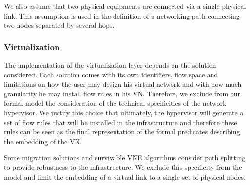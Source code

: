 We also assume that two physical equipments are connected via a single physical link. This assumption is used in the definition of a networking path connecting two nodes separated by several hops.

\subsubsection{Virtualization}
The implementation of the virtualization layer depends on the solution considered.
Each solution comes with its own identifiers, flow space and limitations on how the user may design his virtual network and with how much granularity he may install flow rules in his VN. Therefore, we exclude from our formal model the consideration of the technical specificities of the network hypervisor.
We justify this choice that ultimately, the hypervisor will generate a set of flow rules that will be installed in the infrastructure and therefore these rules can be seen as the final representation of the formal predicates describing the embedding of the VN.

Some migration solutions and survivable VNE algorithms consider path splitting to provide robustness to the infrastructure.
We exclude this specificity from the model and limit the embedding of a virtual link to a single set of physical nodes.

